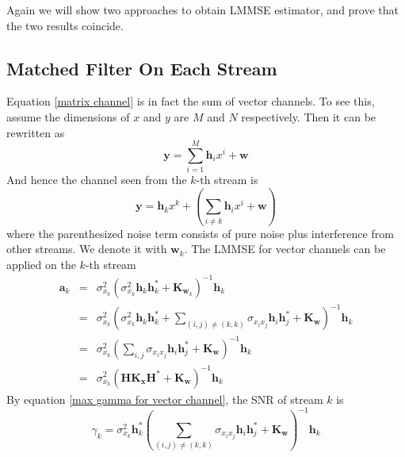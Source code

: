 \documentclass[12pt]{article}
\theoremstyle{definition}
\begin{document}
Again we will show two approaches to obtain LMMSE estimator, and prove that the two results coincide.
\subsection{Matched Filter On Each Stream}
Equation \ref{matrix channel} is in fact the sum of vector channels. To see this, assume the dimensions of $x$ and $y$ are $M$ and $N$ respectively. Then it can be rewritten as
$$\bm{y}=\sum_{i=1}^M\bm{h}_ix^i+\bm{w}$$
And hence the channel seen from the $k$-th stream is
$$\bm{y}=\bm{h}_kx^k+\left(\sum_{i\not=k}\bm{h}_ix^i+\bm{w}\right)$$
where the parenthesized noise term consists of pure noise plus interference from other streams. We denote it with $\bm{w}_k$. The LMMSE for vector channels can be applied on the $k$-th stream
\begin{eqnarray}
	\bm{a}_k&=&\sigma_{x_k}^2\left(\sigma_{x_k}^2\bm{h}_k\bm{h}_k^*+\bm{K}_{\bm{w}_k}\right)^{-1}\bm{h}_k\nonumber\\
	&=& \sigma_{x_k}^2\left(\sigma_{x_k}^2\bm{h}_k\bm{h}_k^*+\sum_{(i,j)\not=(k,k)}\sigma_{x_ix_j}\bm{h}_i\bm{h}_j^*+\bm{K_w}\right)^{-1}\bm{h}_k\nonumber\\
	&=&\sigma_{x_k}^2\left(\sum_{i,j}\sigma_{x_ix_j}\bm{h}_i\bm{h}_j^*+\bm{K_w}\right)^{-1}\bm{h}_k\nonumber\\
	&=&\sigma_{x_k}^2\left(\bm{HK_xH}^*+\bm{K_w}\right)^{-1}\bm{h}_k\label{a_k}
\end{eqnarray}
By equation \ref{max gamma for vector channel}, the SNR of stream $k$ is 
\begin{equation}
	\gamma_k=\sigma_{x_k}^2\bm{h}_k^*\left(\sum_{(i,j)\not=(k,k)}\sigma_{x_ix_j}\bm{h}_i\bm{h}_j^*+\bm{K_w}\right)^{-1}\bm{h}_k\label{gamma_k matched filter on stream}
\end{equation}
\end{document}
